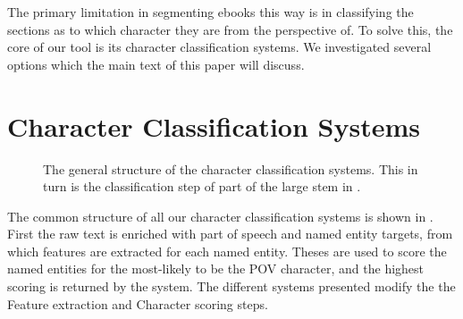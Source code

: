 \documentclass[11pt,a4paper]{article}
\begin{document}
The primary limitation in segmenting ebooks this way is in classifying the sections as to which character they are from the perspective of.
To solve this, the core of our tool is its character classification systems.
We investigated several options which the main text of this paper will discuss.


\section{Character Classification Systems}
\begin{figure*}
	\caption{The general structure of the character classification systems. This in turn is the classification step of part of the large stem in . \label{fig:classify}}
\end{figure*}
The common structure of all our character classification systems is shown in .
First the raw text is enriched with part of speech and named entity targets,
from which features are extracted for each named entity.
Theses are used to score the named entities for the most-likely to be the POV character, and the highest scoring is returned by the system.
The different systems presented modify the the Feature extraction and Character scoring steps.
\end{document}

